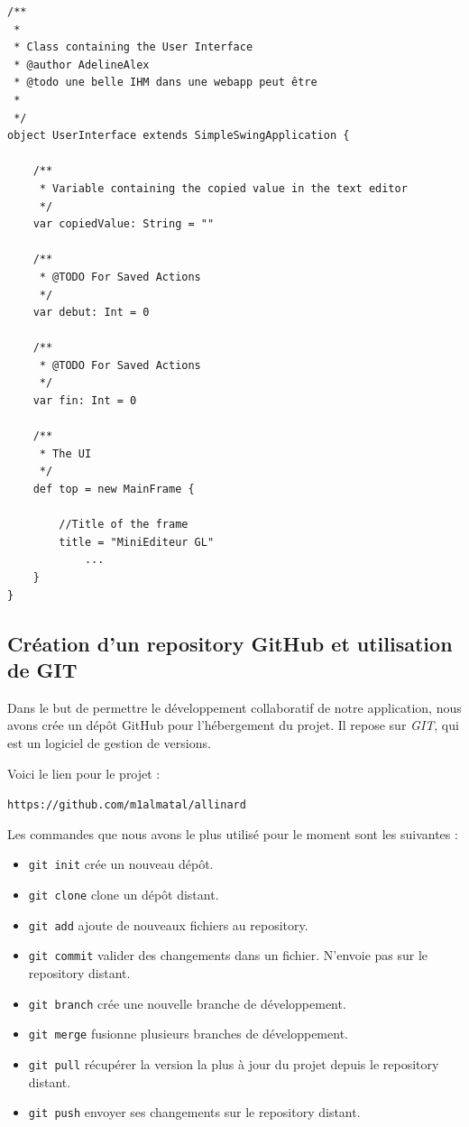 \documentclass[a4paper,11pt]{article}
\begin{document}
	
\newpage
\begin{lstlisting}[caption=Exemple de scaladoc, label=java]
/**
 *
 * Class containing the User Interface
 * @author AdelineAlex
 * @todo une belle IHM dans une webapp peut être
 *
 */
object UserInterface extends SimpleSwingApplication {

	/**
	 * Variable containing the copied value in the text editor
	 */
	var copiedValue: String = ""
	
	/**
	 * @TODO For Saved Actions
	 */
	var debut: Int = 0

	/**
	 * @TODO For Saved Actions
	 */
	var fin: Int = 0

	/**
	 * The UI
	 */
	def top = new MainFrame {

		//Title of the frame
		title = "MiniEditeur GL"
			...
	}
}

\end{lstlisting}	





\subsection{Création d'un repository GitHub et utilisation de GIT}
Dans le but de permettre le développement collaboratif de notre application, nous avons crée un dépôt GitHub pour l'hébergement du projet. Il repose sur \textit{GIT}, qui est un logiciel de gestion de versions.

Voici le lien pour le projet :
\begin{center}
\texttt{https://github.com/m1almatal/allinard}
\end{center}

Les commandes que nous avons le plus utilisé pour le moment sont les suivantes :
\begin{itemize}
		\item \texttt{git init} crée un nouveau dépôt.
		\item \texttt{git clone} clone un dépôt distant.
		\item \texttt{git add} ajoute de nouveaux fichiers au repository.
		\item \texttt{git commit} valider des changements dans un fichier. N'envoie pas sur le repository distant.
		\item \texttt{git branch} crée une nouvelle branche de développement.
		\item \texttt{git merge} fusionne plusieurs branches de développement.
		\item \texttt{git pull} récupérer la version la plus à jour du projet depuis le repository distant.
		\item \texttt{git push} envoyer ses changements sur le repository distant.
\end{itemize}
\end{document}
